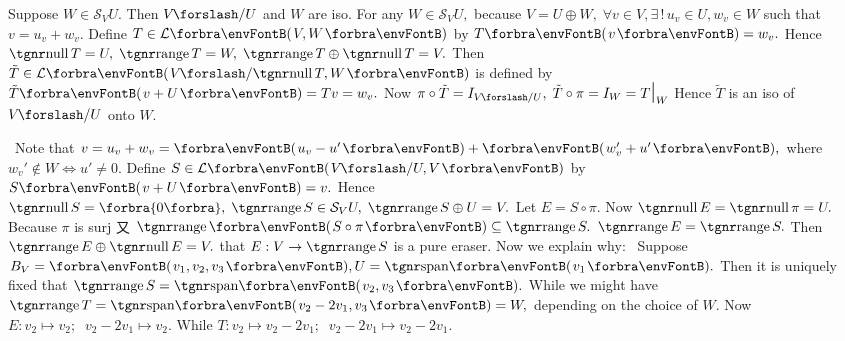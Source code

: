 \documentclass[a4paper, 11pt, UTF8]{article}
\begin{document}
\begin{large}
\BulletPointX\NoteFor{[3.88, 3.90, 3.91]} {\vspace{2pt}Suppose $W\in\mathcal{S}_V U.$ Then $V\mySlash U$ and $W$ are iso.}\TextB{}
{\vspace{2pt}For any $W\in\mathcal{S}_V U,$ because $V=U\oplus W,\;\forall v\in V,\exists\,!\,u_v\in U,w_v\in W$ such that $v=u_v+w_v.$}\TextB{}
{\vspace{2pt}Define $T\in\Lm{V,W}$ by $T\Par{v}=w_v.$ Hence $\null T=U,\;\range T=W,\;\range T\oplus\null T=V.$}\TextB{}
{\vspace{2pt}Then $\tilde{T}\in\Lm{V\mySlash \null T,W}$ is defined by $\tilde{T}\Par{v+U}=Tv=w_v.$}\TextB{}
{\vspace{2pt}Now $\pi\circ\tilde{T}=I_{V\mySlash U},\;\tilde{T}\circ\pi=I_{W}=T\mid_W$ Hence $\tilde{T}$ is an iso of $V\mySlash U$ onto $W.$}\par
{\vspace{2pt}\BulletPointX\Comment \,\,\,Note that $v=u_v+w_v=\Par{u_v-u'}+\Par{w_v'+u'},$ where $w_v'\not\in W\Longleftrightarrow u'\neq 0.$}\TextB{}
{\vspace{2pt}Define $S\in\Lm{V\mySlash U,V}$ by $S\Par{v+U}=v.$ Hence $\null S=\zeroSubs,\;\range S\in\mathcal{S}_V U,\;\range S\oplus U=V.$}\TextB{}
{\vspace{2pt}Let $E=S\circ\pi.$ Now $\null E=\null\pi=U.$ Because $\pi$ is surj 又 $\range\Par{S\circ\pi}\subseteq\range S.$ $\range E=\range S.$}\TextB{}
{\vspace{2pt}Then $\range E\oplus\null E=V.$ \NOTICE that $E:V\rightarrow\range S$ is a pure {\tgsl eraser}. Now we explain why:}\TextB{}
{\vspace{2pt}\Example \,\,\,Suppose $B_V=\Par{v_1,v_2,v_3},U=\Span{v_1}.$ Then it is uniquely fixed that $\range S=\Span{v_2,v_3}.$}\TextB{}
{\vspace{2pt}While we might have $\range T=\Span{v_2-2v_1,v_3}=W,$ depending on the choice of $W.$}\TextB{}
{Now $E:v_2\mapsto v_2;\;\;v_2-2v_1\mapsto v_2.$ While $T:v_2\mapsto v_2-2v_1;\;\;v_2-2v_1\mapsto v_2-2v_1.$}
\SepLine


\end{large}
\end{document}

